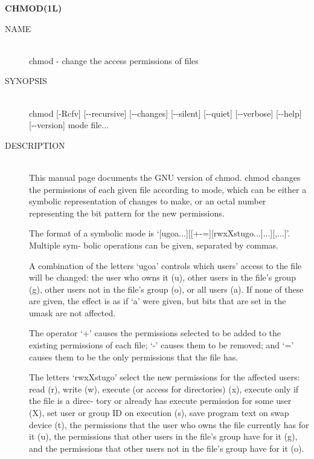 
\begin{center} {\bf
CHMOD(1L)
} \end{center}
\begin{description}


\item[NAME] \hfill \\
       chmod - change the access permissions of files

\item[SYNOPSIS] \hfill \\
       chmod   [-Rcfv]   [-\hspace{.01cm}-recursive]   [-\hspace{.01cm}-changes]   [-\hspace{.01cm}-silent]
       [-\hspace{.01cm}-quiet] [-\hspace{.01cm}-verbose] [-\hspace{.01cm}-help] [-\hspace{.01cm}-version] mode file...

\item[DESCRIPTION] \hfill \\
       This manual page  documents  the  GNU  version  of  chmod.
       chmod changes the permissions of each given file according
       to mode, which can be either a symbolic representation  of
       changes  to  make, or an octal number representing the bit
       pattern for the new permissions.

       The     format     of     a     symbolic      mode      is
       `[ugoa...][[+-=][rwxXstugo...]...][,...]'.   Multiple sym-
       bolic operations can be given, separated by commas.

       A combination of the letters `ugoa' controls which  users'
       access  to  the file will be changed: the user who owns it
       (u), other users in the file's group (g), other users  not
       in  the  file's  group  (o), or all users (a).  If none of
       these are given, the effect is as if `a' were  given,  but
       bits that are set in the umask are not affected.

       The  operator  `+'  causes  the permissions selected to be
       added to the existing permissions of each file; `-' causes
       them  to  be  removed;  and `=' causes them to be the only
       permissions that the file has.

       The letters `rwxXstugo' select the new permissions for the
       affected  users:  read  (r), write (w), execute (or access
       for directories) (x), execute only if the file is a direc-
       tory  or already has execute permission for some user (X),
       set user or group ID on execution (s), save  program  text
       on swap device (t), the permissions that the user who owns
       the file currently has for it (u),  the  permissions  that
       other  users  in the file's group have for it (g), and the
       permissions that other users not in the file's group  have
       for it (o).


\end{description}
